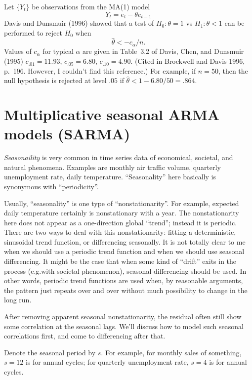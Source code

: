 \documentclass[12pt]{article}
\begin{document}
\begin{enumerate}
Let $\{Y_t\}$ be observations from the MA(1) model
\[
Y_t = e_t - \theta e_{t-1}
\]
Davis and Dunsmuir (1996) showed that a test of
$H_0: \theta = 1$ vs $H_1: \theta < 1$ can be performed to reject $H_0$
when
\[
\hat{\theta} <- c_\alpha/n.
\]
Values of $c_\alpha$ for typical $\alpha$ are given in
Table~3.2 of Davis, Chen, and Dunsmuir (1995)
$c_{.01} = 11.93$,
$c_{.05} = 6.80$,
$c_{.10} = 4.90$.
(Cited in Brockwell and Davis 1996, p.~196.
However, I couldn't find this reference.)
For example,
if $n=50$,
then the null hypothesis is rejected at level $.05$ if
$\hat{\theta} < 1 - 6.80/50 = .864$.

\end{enumerate}


\section{Multiplicative seasonal ARMA models (SARMA)}

\emph{Seasonaility} is very common in time series data
of economical, societal, and natural phenomena.
Examples are monthly air traffic volume,
quarterly unemployment rate, daily temperature.
``Seasonality'' here basically is synonymous with ``periodicity''.

Usually, ``seasonality'' is one type of ``nonstationarity''.
For example, expected daily temperature certainly is nonstationary with
a year.
The nonstationarity here does not appear as a one-direction global
``trend''; instead it is periodic.
There are two ways to deal with this nonstationarity:
fitting a deterministic, sinusoidal trend function,
or differencing seasonally.
It is not totally clear to me when we should use a periodic trend
function and when we should use seasonal differencing.
It might be the case that when some kind of ``drift'' exits in the
process (e.g.\@ with societal phenomenon),
seasonal differencing should be used.
In other words,
periodic trend functions are used when,
by reasonable arguments,
the pattern just repeats over and over without much possibility to
change in the long run.

After removing apparent seasonal nonstationarity,
the residual often still show some correlation at the seasonal lags.
We'll discuss how to model such seasonal correlations first,
and come to differencing after that.


Denote the seasonal period by $s$.
For example,
for monthly sales of something, $s = 12$ is for annual cycles;
for quarterly unemployment rate, $s = 4$ is for annual cycles.
\end{document}
